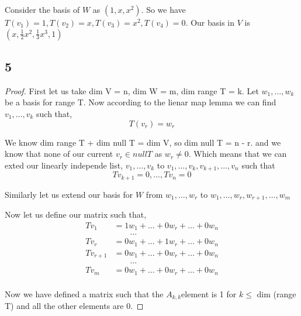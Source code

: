 \documentclass[a4paper]{report}
\begin{document}
Consider the basis of $W$ as $(1,x,x^2)$. So we have $T(v_1) = 1, T(v_2) = x, T(v_3) = x^2, T(v_4) = 0$. Our basis in $V$ is $(x, \frac{1}{2}x^2, \frac{1}{3}x^{3}, 1)$


\subsection*{5}
\begin{proof}
    First let us take dim V = n, dim W = m, dim range T = k. Let $w_1,\dots,w_k$ be a basis for range T. Now according to the lienar map lemma we can find  $v_1,\dots, v_k$ such that, 
    $$ T(v_r) = w_r $$ 

    We know dim range T + dim null T = dim V, so dim null T = n - r. and we know that none of our current $v_r \in null T$ as $w_r \ne 0$. Which means that we can exted our linearly independe list,  $v_1,\dots,v_k$ to $v_1,\dots,v_k,v_{k+1},\dots,v_n$ such that  
    $$ Tv_{k+1} = 0,\dots,Tv_{n} = 0 $$ 

    Similarly let us extend our basis for $W$ from $w_1,\dots,w_r$ to $w_1,\dots,w_r,w_{r+1},\dots,w_m$

    Now let us define our matrix such that, 
    \begin{align*}
        Tv_1 &= 1w_1 +\dots+ 0w_r + \dots + 0 w_n\\
        &\qquad\dots\\
        Tv_r &= 0w_1 + \dots + 1w_r + \dots + 0 w_n\\
        Tv_{r+1} &= 0w_1 + \dots + 0w_r + \dots + 0 w_n\\
        &\qquad\dots\\
        Tv_m &= 0w_1 + \dots + 0w_r + \dots + 0 w_n\\
    \end{align*}

    Now we have defined a matrix such that the $A_{k,k}$element is 1 for $k \le $ dim (range T) and all the other elements are 0.
\end{proof}



$$  $$ 
\end{document}
